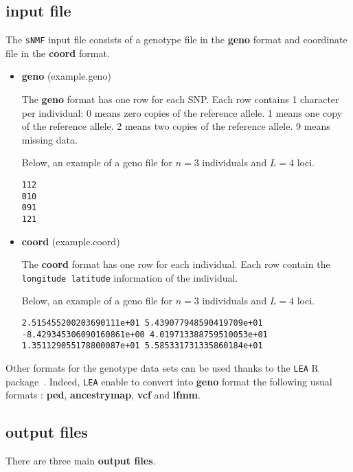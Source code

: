 \documentclass[10pt,a4paper]{article}
\begin{document}
\subsection{input file}
The {\tt sNMF} input file consists of a genotype file in the {\bf geno} format and coordinate file in the {\bf coord} format. 
\begin{itemize}
\item {\bf geno} (example.geno)

The {\bf geno} format has one row for each SNP.
  Each row contains 1 character per individual:
  0 means zero copies of the reference allele.
  1 means one copy of the reference allele.
  2 means two copies of the reference allele.
  9 means missing data.

Below, an example of a geno file for $n=3$ individuals and $L=4$ loci.
\begin{center}
\footnotesize
\begin{Verbatim}[frame=single]
112
010
091
121
\end{Verbatim}
\end{center}


\item {\bf coord} (example.coord)

The {\bf coord} format has one row for each individual. Each row contain the \verb|longitude latitude| information of the individual.

Below, an example of a geno file for $n=3$ individuals and $L=4$ loci.
\begin{center}
\footnotesize
\begin{Verbatim}[frame=single]
2.515455200203690111e+01 5.439077948590419709e+01
-8.429345306090160861e+00 4.019713388759510053e+01
1.351129055178800087e+01 5.585331731335860184e+01
\end{Verbatim}
\end{center}

\end{itemize}

\noindent
Other formats for the genotype data sets can be used thanks to the {\tt LEA} R package~\cite{frichot2015lea}. Indeed, {\tt LEA} enable to convert into {\bf geno} format the following usual formats : {\bf ped}, {\bf ancestrymap}, {\bf vcf} and {\bf lfmm}.

\subsection{output files}
\noindent
There are three main {\bf output files}.
\end{document}
